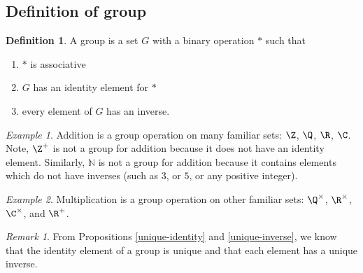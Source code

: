 \documentclass[12pt]{amsart}
\newcommand{\terminology}[1]{\textbf{\textit{#1}}}
\renewcommand{\terminology}[1]{#1}
\newcommand{\term}{\terminology}
\theoremstyle{plain}
\theoremstyle{definition}
\newtheorem{defn}[thm]{Definition}
\theoremstyle{remark}
\newtheorem*{remark}{Remark}
\newtheorem*{exam}{Example}
\begin{document}
\subsection{Definition of group}
\begin{defn}
  A \term{group} is a set $G$ with a binary operation $*$ such that 
\begin{enumerate}
\item $*$ is associative
\item $G$ has an identity element for $*$
\item every element of $G$ has an inverse.
\end{enumerate}
\end{defn}

\begin{exam}
  Addition is a group operation on many familiar sets: $\Z$, $\Q$,
  $\R$, $\C$.  Note, $\Z^+$ is not a group for addition because it
  does not have an identity element.  Similarly, $\mathbb N$ is not a
  group for addition because it contains elements which do not have
  inverses (such as $3$, or $5$, or any  positive integer).
\end{exam}

\begin{exam}
  Multiplication is a group operation on other familiar sets:
  $\Q^\times$, $\R^\times$, $\C^\times$, and $\R^+$.
\end{exam}




\begin{remark}
From Propositions \ref{unique-identity} and \ref{unique-inverse}, we
know that the identity element of a group is unique and that each
element has a unique inverse.
\end{remark}
\end{document}
